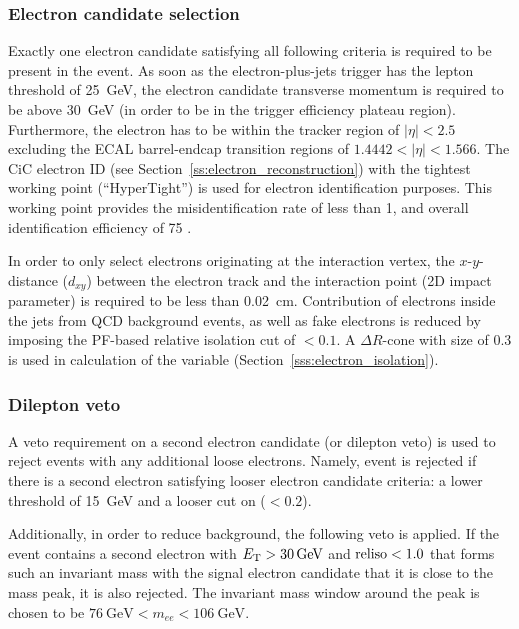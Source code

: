 \subsubsection*{Electron candidate selection}
Exactly one electron candidate satisfying all following criteria is required to be present in the event. As soon as the
electron-plus-jets trigger has the lepton \pt threshold of \SI{25}{\GeV}, the electron candidate transverse momentum is
required to be above \SI{30}{\GeV} (in order to be in the trigger efficiency plateau region). Furthermore, the electron
has to be within the tracker region of $|\eta| < 2.5$ excluding the ECAL barrel-endcap transition regions of $1.4442 <
|\eta| < 1.566$. The CiC electron ID (see Section~\ref{ss:electron_reconstruction}) with the tightest working point
(``HyperTight'') is used for electron identification purposes. This working point provides the misidentification rate of
less than \SI{1}{\pc}, and overall identification efficiency of \SI{75}{\pc} \autocite{CiC_ID}.

In order to only select electrons originating at the interaction vertex, the $x$-$y$-distance ($d_{xy}$) between the
electron track and the interaction point (2D impact parameter) is required to be less than \SI{0.02}{\cm}. Contribution
of electrons inside the jets from QCD background events, as well as fake electrons is reduced by imposing the PF-based
relative isolation cut of \reliso $< 0.1$. A $\Delta R$-cone with size of \num{0.3} is used in calculation of the
\reliso variable (Section~\ref{sss:electron_isolation}).

\subsubsection*{Dilepton veto}
A veto requirement on a second electron candidate (or dilepton veto) is used to reject events with any additional loose
electrons. Namely, event is rejected if there is a second electron satisfying looser electron candidate criteria: a
lower \ET threshold of \SI{15}{\GeV} and a looser cut on \reliso ($<0.2$).

Additionally, in order to reduce \ZpJets background, the following veto is applied. If the event contains a second
electron with $\ET > \SI{30}{\GeV}$ and $\textrm{reliso} < 1.0$ that forms such an invariant mass with the signal electron
candidate that it is close to the \Z mass peak, it is also rejected. The invariant mass window around the \Z peak is
chosen to be $\SI{76}{\GeV} < m_{ee} < \SI{106}{\GeV}$.

